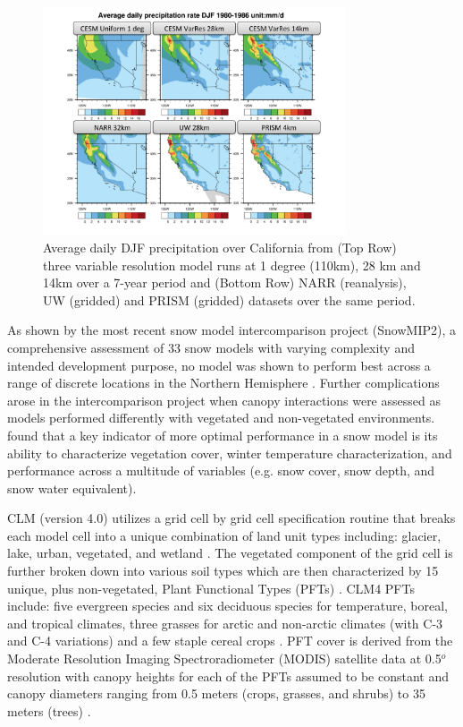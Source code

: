 \documentclass[11pt]{article}
\begin{document}
\begin{figure}
\begin{center}
\includegraphics[width=0.8\textwidth]{VariableResolutionPrecipitation.pdf}
\end{center}
\caption{Average daily DJF precipitation over California from (Top Row) three variable resolution model runs at 1 degree (110km), 28 km and 14km over a 7-year period and (Bottom Row) NARR (reanalysis), UW (gridded) and PRISM (gridded) datasets over the same period.} \label{fig:VarResPrecipitation}
\end{figure}

As shown by the most recent snow model intercomparison project (SnowMIP2), a comprehensive assessment of 33 snow models with varying complexity and intended development purpose, no model was shown to perform best across a range of discrete locations in the Northern Hemisphere \citep{rutter2009SnowMIP2}.  Further complications arose in the intercomparison project when canopy interactions were assessed as models performed differently with vegetated and non-vegetated environments.  \citet{rutter2009SnowMIP2} found that a key indicator of more optimal performance in a snow model is its ability to characterize vegetation cover, winter temperature characterization, and performance across a multitude of variables (e.g. snow cover, snow depth, and snow water equivalent).
    
CLM (version 4.0) utilizes a grid cell by grid cell specification routine that breaks each model cell into a unique combination of land unit types including: glacier, lake, urban, vegetated, and wetland \citep{lawrence2011parameterization}.  The vegetated component of the grid cell is further broken down into various soil types which are then characterized by 15 unique, plus non-vegetated, Plant Functional Types (PFTs) \citep{lawrence2011parameterization}. CLM4 PFTs include: five evergreen species and six deciduous species for temperature, boreal, and tropical climates, three grasses for arctic and non-arctic climates (with C-3 and C-4 variations) and a few staple cereal crops \citep{lawrence2011parameterization}.  PFT cover is derived from the Moderate Resolution Imaging Spectroradiometer (MODIS) satellite data at 0.5$^{o}$ resolution with canopy heights for each of the PFTs assumed to be constant and canopy diameters ranging from 0.5 meters (crops, grasses, and shrubs) to 35 meters (trees) \citep{lawrence2011parameterization}.  
\end{document}
